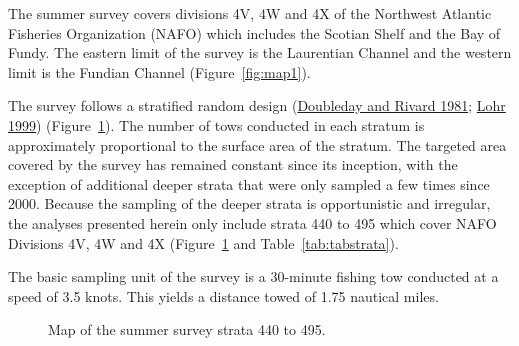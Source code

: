 \documentclass[12pt]{article}\usepackage[]{graphicx}\usepackage[]{color}
\begin{document}
The summer survey covers divisions 4V, 4W and 4X of the Northwest Atlantic Fisheries Organization (NAFO) which includes the Scotian Shelf and the Bay of Fundy. The eastern limit of the survey is the Laurentian Channel and the western limit is the Fundian Channel (Figure~\ref{fig:map1}).

The survey follows a stratified random design (\protect\hyperlink{ref-DoubledayRivard1981}{Doubleday and Rivard 1981}; \protect\hyperlink{ref-Lohr1999}{Lohr 1999}) (Figure~\ref{fig:map2}). The number of tows conducted in each stratum is approximately proportional to the surface area of the stratum. The targeted area covered by the survey has remained constant since its inception, with the exception of additional deeper strata that were only sampled a few times since 2000. Because the sampling of the deeper strata is opportunistic and irregular, the analyses presented herein only include strata 440 to 495 which cover NAFO Divisions 4V, 4W and 4X (Figure~\ref{fig:map2} and Table~\ref{tab:tabstrata}).

The basic sampling unit of the survey is a 30-minute fishing tow conducted at a speed of 3.5 knots. This yields a distance towed of 1.75 nautical miles.


\begin{figure}[htb]

{\centering {} 

}

\caption{Map of the summer survey strata 440 to 495.}\label{fig:map2}
\end{figure}
\newpage
\end{document}

